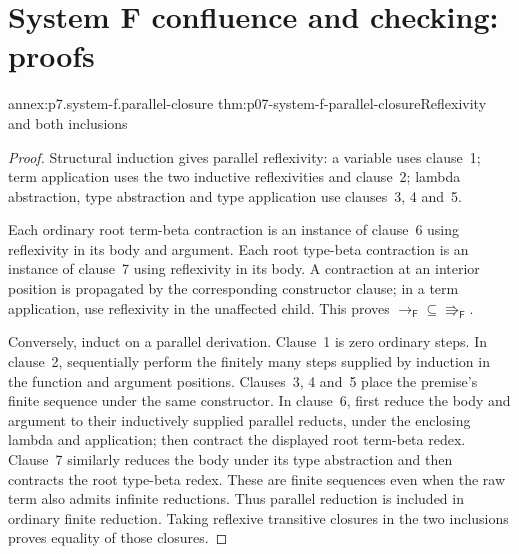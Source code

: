 \section{System F confluence and checking: proofs}
\label{sec:annex-p07-system-f-confluence-and-checking}

\begin{annexitem}{annex:p7.system-f.parallel-closure}
 {thm:p07-system-f-parallel-closure}{Reflexivity and both inclusions}
\begin{proof}
Structural induction gives parallel reflexivity: a variable uses clause~1;
term application uses the two inductive reflexivities and clause~2; lambda
abstraction, type abstraction and type application use clauses~3, 4 and~5.

Each ordinary root term-beta contraction is an instance of clause~6 using
reflexivity in its body and argument. Each root type-beta contraction is
an instance of clause~7 using reflexivity in its body. A contraction at
an interior position is propagated by the corresponding constructor clause;
in a term application, use reflexivity in the unaffected child. This
proves \(\to_{\mathsf F}\subseteq\Rrightarrow_{\mathsf F}\).

Conversely, induct on a parallel derivation. Clause~1 is zero ordinary
steps. In clause~2, sequentially perform the finitely many steps supplied
by induction in the function and argument positions. Clauses~3, 4 and~5
place the premise's finite sequence under the same constructor. In
clause~6, first reduce the body and argument to their inductively supplied
parallel reducts, under the enclosing lambda and application; then contract
the displayed root term-beta redex. Clause~7 similarly reduces the body
under its type abstraction and then contracts the root type-beta redex.
These are finite sequences even when the raw term also admits infinite
reductions. Thus parallel reduction is included in ordinary finite
reduction. Taking reflexive transitive closures in the two inclusions
proves equality of those closures.
\end{proof}
\end{annexitem}

